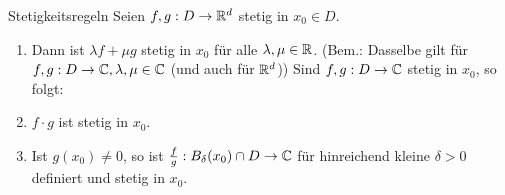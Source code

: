 \documentclass[main.tex]{subfiles}
\begin{document}
\begin{karte}{Stetigkeitsregeln}
    Seien \( f,g : D \rightarrow \mathbb{R}^d \) 
    stetig in \( x_0 \in D \).
    \begin{enumerate}
        \item Dann ist \( \lambda f + \mu g \) 
        stetig in \( x_0 \) für alle 
        \( \lambda, \mu \in \mathbb{R} \).
        (Bem.: Dasselbe gilt für \( f,g:D\rightarrow \mathbb{C}, 
        \lambda, \mu \in \mathbb{C} \) (und auch für \( \mathbb{R}^d \)))
        Sind \( f,g: D\rightarrow \mathbb{C} \) stetig 
        in \( x_0 \), so folgt:
        \item \( f \cdot g \) ist stetig in \( x_0 \).
        \item Ist \( g(x_0) \neq 0 \), so ist \( \frac{f}{g} : 
        B_\delta(x_0) \cap D \rightarrow \mathbb{C} \) 
        für hinreichend kleine \( \delta > 0 \) 
        definiert und stetig in \( x_0 \).
    \end{enumerate}
\end{karte}
\end{document}
